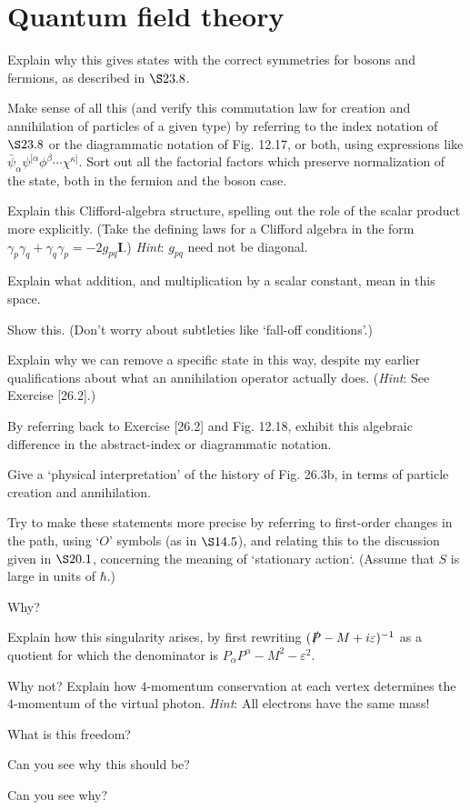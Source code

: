 \documentclass[../road-to-reality.tex]{subfiles}
\begin{document}
	\printanswers
	
	\section{Quantum field theory}
	
	\begin{questions}
		\question Explain why this gives states with the correct symmetries for bosons and fermions, as described in $\S23.8$.
		
		\question Make sense of all this (and verify this commutation law for creation and annihilation of particles of a given type) by referring to the index notation of $\S23.8$ or the diagrammatic notation of Fig. 12.17, or both, using expressions like $\bar{\psi}_{\alpha}\psi^{[\alpha}\phi^{\beta}\cdots\chi^{\kappa]}$. Sort out all the factorial factors which preserve normalization of the state, both in the fermion and the boson case.
		
		\question Explain this Clifford-algebra structure, spelling out the role of the scalar product more explicitly. (Take the defining laws for a Clifford algebra in the form $\gamma_p\gamma_q + \gamma_q\gamma_p = -2g_{pq}\mathbf{I}$.) \textit{Hint}: $g_{pq}$ need not be diagonal.
		
		\question Explain what addition, and multiplication by a scalar constant, mean in this space.
		
		\question Show this. (Don't worry about subtleties like `fall-off conditions'.)
		
		\question Explain why we can remove a specific state in this way, despite my earlier qualifications about what an annihilation operator actually does. (\textit{Hint}: See Exercise [26.2].)
		
		\question By referring back to Exercise [26.2] and Fig. 12.18, exhibit this algebraic difference in the abstract-index or diagrammatic notation.
		
		\question Give a `physical interpretation' of the history of Fig. 26.3b, in terms of particle creation and annihilation.
		
		\question Try to make these statements more precise by referring to first-order changes in the path, using `$O$' symbols (as in $\S14.5$), and relating this to the discussion given in $\S20.1$, concerning the meaning of `stationary action`. (Assume that $S$ is large in units of $\hbar$.)
		
		\question Why?
		
		\question Explain how this singularity arises, by first rewriting $(\slashed{P} - M + i\varepsilon)^{-1}$ as a quotient for which the denominator is $P_{\alpha}P^{\alpha} - M^2 - \varepsilon^2$.
		
		\question Why not? Explain how $4$-momentum conservation at each vertex determines the $4$-momentum of the virtual photon. \textit{Hint}: All electrons have the same mass!
		
		\question What is this freedom?
		
		\question Can you see why this should be?
		
		\question Can you see why?
		
		
	\end{questions}
\end{document}
